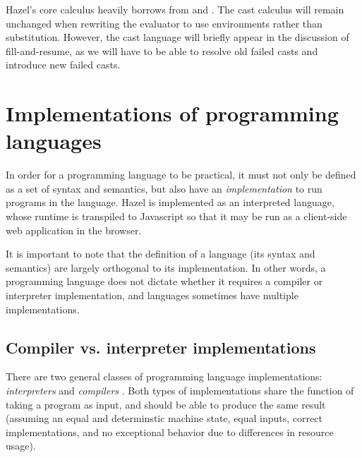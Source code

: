 \begin{singlespace}
  \begin{mathpar}
  \end{mathpar}
\end{singlespace}

Hazel's core calculus heavily borrows from \gtlc and \gtclc. The cast calculus will remain unchanged when rewriting the evaluator to use environments rather than substitution. However, the cast language will briefly appear in the discussion of fill-and-resume, as we will have to be able to resolve old failed casts and introduce new failed casts.

\section{Implementations of programming languages}
\label{sec:interpreters}

In order for a programming language to be practical, it must not only be defined as a set of syntax and semantics, but also have an \textit{implementation} to run programs in the language. Hazel is implemented as an interpreted language, whose runtime is transpiled to Javascript so that it may be run as a client-side web application in the browser.

It is important to note that the definition of a language (its syntax and semantics) are largely orthogonal to its implementation. In other words, a programming language does not dictate whether it requires a compiler or interpreter implementation, and languages sometimes have multiple implementations.

\subsection{Compiler vs. interpreter implementations}
\label{sec:comp-vs-interp}

There are two general classes of programming language implementations: \textit{interpreters} and \textit{compilers} \cite{aho86}. Both types of implementations share the function of taking a program as input, and should be able to produce the same result (assuming an equal and determinstic machine state, equal inputs, correct implementations, and no exceptional behavior due to differences in resource usage).

